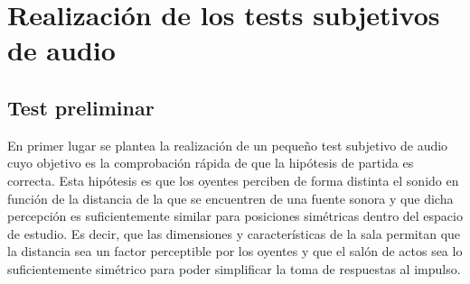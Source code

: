 \documentclass[11pt,a4paper,twoside]{book}
\author{Víctor de Tejada Molera}
\begin{document}
    \chapter{Realización de los tests subjetivos de audio}
        \section{Test preliminar}
            En primer lugar se plantea la realización de un pequeño test subjetivo de audio cuyo objetivo es la comprobación rápida de que la hipótesis de partida es correcta. Esta hipótesis es que los oyentes perciben de forma distinta el sonido en función de la distancia de la que se encuentren de una fuente sonora y que dicha percepción es suficientemente similar para posiciones simétricas dentro del espacio de estudio. Es decir, que las dimensiones y características de la sala permitan que la distancia sea un factor perceptible por los oyentes y que el salón de actos sea lo suficientemente simétrico para poder simplificar la toma de respuestas al impulso.
            
\end{document}
